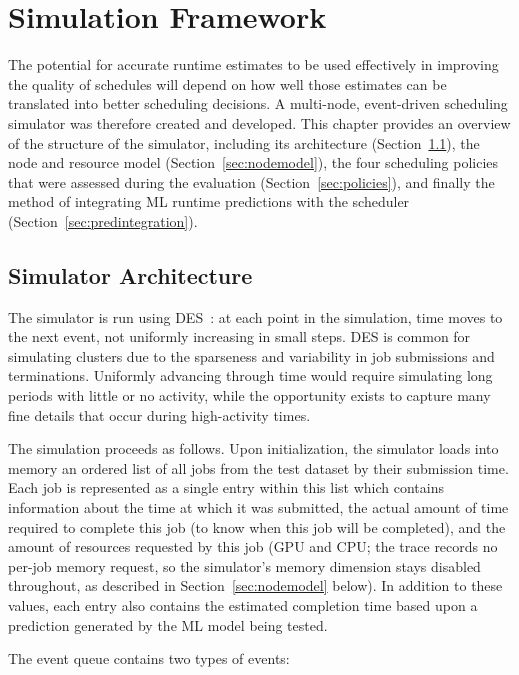\chapter{Simulation Framework}\label{chp:simulation}

The potential for accurate runtime estimates to be used effectively in improving the quality of schedules will depend on how well those estimates can be translated into better scheduling decisions. A multi-node, event-driven scheduling simulator was therefore created and developed. This chapter provides an overview of the structure of the simulator, including its architecture (Section~\ref{sec:simarchitecture}), the node and resource model (Section~\ref{sec:nodemodel}), the four scheduling policies that were assessed during the evaluation (Section~\ref{sec:policies}), and finally the method of integrating ML runtime predictions with the scheduler (Section~\ref{sec:predintegration}).

\section{Simulator Architecture}
\label{sec:simarchitecture}

The simulator is run using DES~\cite{law2015simulation}: at each point in the simulation, time moves to the next event, not uniformly increasing in small steps. DES is common for simulating clusters due to the sparseness and variability in job submissions and terminations. Uniformly advancing through time would require simulating long periods with little or no activity, while the opportunity exists to capture many fine details that occur during high-activity times.

The simulation proceeds as follows. Upon initialization, the simulator loads into memory an ordered list of all jobs from the test dataset by their submission time. Each job is represented as a single entry within this list which contains information about the time at which it was submitted, the actual amount of time required to complete this job (to know when this job will be completed), and the amount of resources requested by this job (GPU and CPU; the trace records no per-job memory request, so the simulator's memory dimension stays disabled throughout, as described in Section~\ref{sec:nodemodel} below). In addition to these values, each entry also contains the estimated completion time based upon a prediction generated by the ML model being tested.

\clearpage
The event queue contains two types of events:

